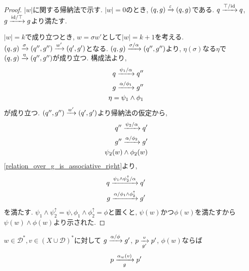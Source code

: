 \documentclass[uplatex,dvipdfmx,a4j]{jsreport}
\begin{document}
  \begin{proof}
    $|w|$に関する帰納法で示す.
    $|w| = 0$のとき, $(q, g) \transarrow{\varepsilon}{} (q, g)$である.
    $q \transarrow{\top / \scriptsize \id}{} q$,
    $g \transarrow{\scriptsize \id / \top}{} g$より満たす.

    $|w| = k$で成り立つとき, $w = \sigma w'$として$|w| = k + 1$を考える.
    $(q, g) \transarrow{\sigma}{} (q'', g'') \transarrow{w'}{} (q', g')$となる.
    $(q, g) \transarrow{\sigma / \alpha}{} (q'', g'')$より,
    $\eta(\sigma)$なる$\eta$で$(q, g) \transarrow{\eta}{} (q'', g'')$が成り立つ.
    構成法より,
    \begin{align*}
      q \transarrow{\psi_1 / \alpha}{} q'' \\
      g \transarrow{\alpha / \phi_1}{} g'' \\
      \eta = \psi_1 \land \phi_1
    \end{align*}
    が成り立つ.
    $(q'', g'') \transarrow{w'}{} (q', g')$より帰納法の仮定から,
    \begin{align*}
      q'' \transarrow{\psi_2 / \alpha}{} q' \\
      g'' \transarrow{\alpha / \phi_2}{} g' \\
      \psi_2(w) \land \phi_2(w)
    \end{align*}
    \ref{relation_over_g_is_associative_right}より,
    \begin{align*}
      q \transarrow{\psi_1 \land \psi_2^\uparrow / \alpha}{} q' \\
      g \transarrow{\alpha / \phi_1 \land \phi_2^\uparrow}{} g'
    \end{align*}
    を満たす.
    $\psi_1 \land \psi_2^\uparrow = \psi, \phi_1 \land \phi_2^\uparrow = \phi$と置くと,
    $\psi(w)$かつ$\phi(w)$を満たすから$\psi(w) \land \phi(w)$より示された.
  \end{proof}

  \begin{lemma} \label{outputfunction_is_reducible}
    $w \in \mathcal{D}^*, v \in (X \cup \mathcal{D})^*$に対して
    $g \transarrow{\alpha / \phi}{} g'$, $p \transarrow{v}{g'} p'$, $\phi(w)$ならば
    \[
      p \transarrow{\alpha_w(v)}{g} p'
    \]
  \end{lemma}
\end{document}
